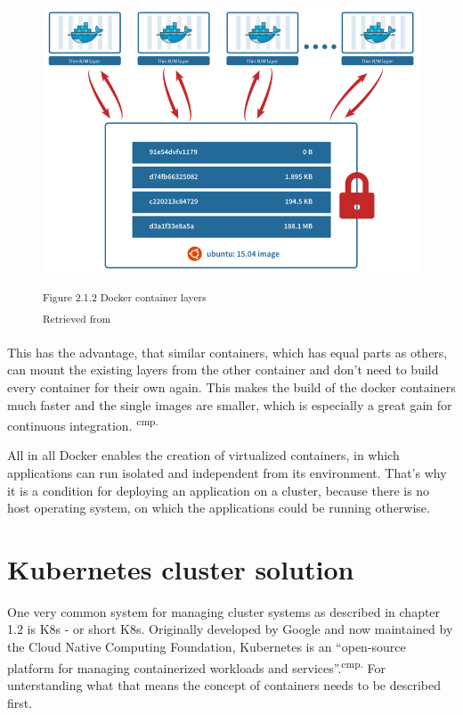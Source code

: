 \begin{figure}[h]
\centering
\includegraphics[width=\textwidth/5*3]{images/docker_layer.png}

\textsuperscript{Figure 2.1.2 Docker container layers}\\
\textsuperscript{Retrieved from \cite{16}}
\end{figure}

This has the advantage, that similar containers, which has equal parts as others, can mount the existing layers from the other container and don't need to build every container for their own again. This makes the build of the docker containers much faster and the single images are smaller, which is especially a great gain for continuous integration. \textsuperscript{cmp.\cite{17}}


All in all Docker enables the creation of virtualized containers, in which applications can run isolated and independent from its environment. That's why it is a condition for deploying an application on a cluster, because there is no host operating system, on which the applications could be running otherwise.


\section{Kubernetes cluster solution}

One very common system for managing cluster systems as described in chapter 1.2 is \acl{K8s} - or short \acs{K8s}. Originally developed by Google and now maintained by the Cloud Native Computing Foundation, Kubernetes is an ``open-source platform for managing containerized workloads and services''.\textsuperscript{cmp.\cite{18}} For unterstanding what that means the concept of containers needs to be described first.

